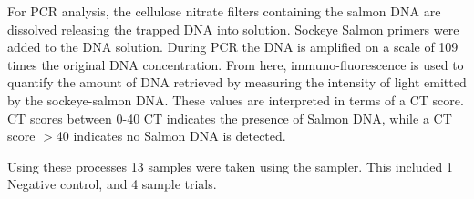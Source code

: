 \documentclass[11pt, letterpaper]{article}
\begin{document}
\newline\par\noindent
For PCR analysis, the cellulose nitrate filters containing the salmon DNA are dissolved releasing the trapped DNA into solution. Sockeye Salmon primers were added to the DNA solution. During PCR the DNA is amplified on a scale of 109 times the original DNA concentration.  From here, immuno-fluorescence is used to quantify the amount of DNA retrieved by measuring the intensity of light emitted by the sockeye-salmon DNA. These values are interpreted in terms of a CT score. CT scores between 0-40 CT indicates the presence of Salmon DNA, while a CT score $>$40 indicates no Salmon DNA is detected.
\newline\par\noindent
Using these processes 13 samples were taken using the sampler. This included 1 Negative control, and 4 sample trials.
\end{document}
